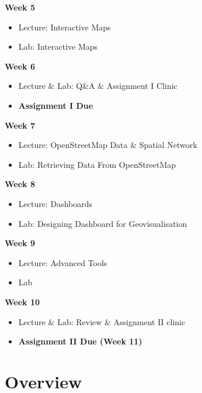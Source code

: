 \documentclass[
  letterpaper,
  DIV=11,
  numbers=noendperiod]{scrreprt}
\providecommand{\tightlist}{%
  \setlength{\itemsep}{0pt}\setlength{\parskip}{0pt}}\usepackage{longtable,booktabs,array}
\begin{document}
\textbf{Week 5}

\begin{itemize}
\item
  Lecture: Interactive Maps
\item
  Lab: Interactive Maps
\end{itemize}

\textbf{Week 6}

\begin{itemize}
\item
  Lecture \& Lab: Q\&A \& Assignment I Clinic
\item
  \textbf{Assignment I Due}
\end{itemize}

\textbf{Week 7}

\begin{itemize}
\item
  Lecture: OpenStreetMap Data \& Spatial Network
\item
  Lab: Retrieving Data From OpenStreetMap
\end{itemize}

\textbf{Week 8}

\begin{itemize}
\item
  Lecture: Dashboards
\item
  Lab: Designing Dashboard for Geovisualisation
\end{itemize}

\textbf{Week 9}

\begin{itemize}
\item
  Lecture: Advanced Tools
\item
  Lab
\end{itemize}

\textbf{Week 10}

\begin{itemize}
\tightlist
\item
  Lecture \& Lab: Review \& Assignment II clinic
\item
  \textbf{Assignment II Due (Week 11)}
\end{itemize}


\chapter*{Overview}\label{overview}

\end{document}
